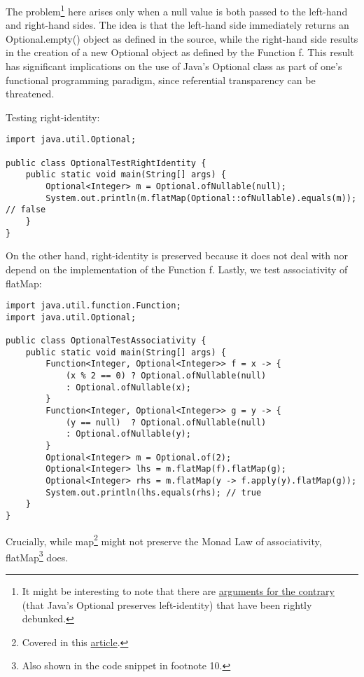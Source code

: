 The problem\footnote{It might be interesting to note that there are \href{https://gist.github.com/ms-tg/7420496}{arguments for the contrary} (that Java's Optional preserves left-identity) that have been rightly debunked.} here arises only when a null value is both passed to the left-hand and right-hand sides. The idea is that the left-hand side immediately returns an Optional.empty() object as defined in the source, while the right-hand side results in the creation of a new Optional object as defined by the Function f. This result has significant implications on the use of Java's Optional class as part of one's functional programming paradigm, since referential transparency can be threatened.

Testing right-identity:
\begin{verbatim}
import java.util.Optional;

public class OptionalTestRightIdentity {
    public static void main(String[] args) {
        Optional<Integer> m = Optional.ofNullable(null);
        System.out.println(m.flatMap(Optional::ofNullable).equals(m)); // false
    }    
}
\end{verbatim}

On the other hand, right-identity is preserved because it does not deal with nor depend on the implementation of the Function f. Lastly, we test associativity of flatMap:

\begin{verbatim}
import java.util.function.Function;
import java.util.Optional;

public class OptionalTestAssociativity {
    public static void main(String[] args) {
        Function<Integer, Optional<Integer>> f = x -> {
            (x % 2 == 0) ? Optional.ofNullable(null) 
            : Optional.ofNullable(x);
        }
        Function<Integer, Optional<Integer>> g = y -> {
            (y == null)  ? Optional.ofNullable(null) 
            : Optional.ofNullable(y);
        }
        Optional<Integer> m = Optional.of(2);
        Optional<Integer> lhs = m.flatMap(f).flatMap(g);
        Optional<Integer> rhs = m.flatMap(y -> f.apply(y).flatMap(g));
        System.out.println(lhs.equals(rhs); // true
    }
}
\end{verbatim}

Crucially, while map\footnote{Covered in this \href{https://www.sitepoint.com/how-optional-breaks-the-monad-laws-and-why-it-matters/}{article}.} might not preserve the Monad Law of associativity, flatMap\footnote{Also shown in the code snippet in footnote 10.} does. 

